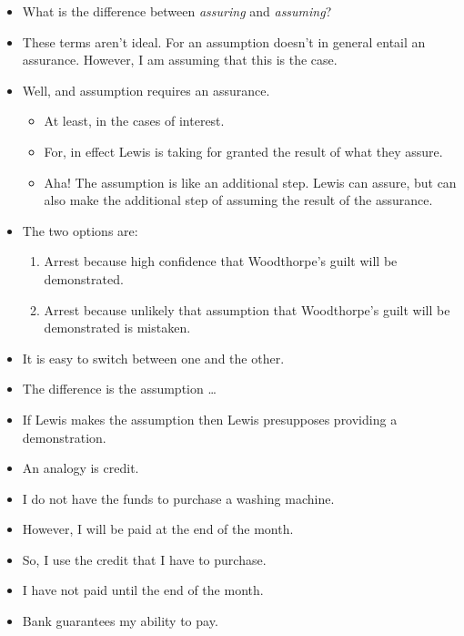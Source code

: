 \documentclass[10pt]{article}
\newcommand{\hozlinedash}[0]{%
  \noindent\hdashrule[0.5ex][c]{\textwidth}{.1pt}{2.5pt}
}
\begin{document}
\begin{itemize}
\item What is the difference between \emph{assuring} and \emph{assuming}?
\item {\color{red}
    These terms aren't ideal.
    For an assumption doesn't in general entail an assurance.
    However, I am assuming that this is the case.
  }
\item Well, and assumption requires an assurance.
  \begin{itemize}
  \item At least, in the cases of interest.
  \item For, in effect Lewis is taking for granted the result of what they assure.
  \item {\color{red}
      Aha!
      The assumption is like an additional step.
      Lewis can assure, but can also make the additional step of assuming the result of the assurance.
    }
  \end{itemize}
\end{itemize}

\begin{itemize}
\item The two options are:
  \begin{enumerate}
  \item Arrest because high confidence that Woodthorpe's guilt will be demonstrated.
  \item Arrest because unlikely that assumption that Woodthorpe's guilt will be demonstrated is mistaken.
  \end{enumerate}
\item It is easy to switch between one and the other.
\item The difference is the assumption \dots
\item If Lewis makes the assumption then Lewis presupposes providing a demonstration.
\end{itemize}


\hozlinedash

\begin{itemize}
\item An analogy is credit.
\item I do not have the funds to purchase a washing machine.
\item However, I will be paid at the end of the month.
\item So, I use the credit that I have to purchase.
\item I have not paid until the end of the month.
\item Bank guarantees my ability to pay.
\end{itemize}
\end{document}
